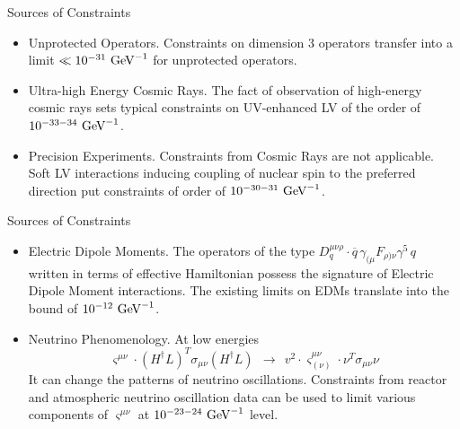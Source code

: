 \documentclass[pdf,UofT06talk,slideColor,colorBG,accumulate]{prosper}
\newcommand{\ov}{\overline}
\newcommand{\GeV}{{\rm GeV}}
\begin{document}
\begin{slide}{Sources of Constraints}

\begin{itemize}

\item {\myit Unprotected Operators}.
	Constraints on dimension 3 operators transfer into a limit
	$ \ll 10^{-31}~\GeV^{-1} $ for unprotected operators.

\item {\myit Ultra-high Energy Cosmic Rays}.
	The fact of observation of high-energy cosmic rays sets typical
	constraints on {\myit UV-enhanced} LV of the order of
	$ 10^{-33-34}~\GeV^{-1} $. 

\item {\myit Precision Experiments}.
	Constraints from Cosmic Rays are not applicable.
	{\myit Soft LV interactions} inducing coupling of nuclear spin to
	the preferred direction put constraints of order of
	$ 10^{-30-31}~\GeV^{-1} $.
	
\end{itemize}

\end{slide}

\begin{slide}{Sources of Constraints}

\begin{itemize}
\item {\myit Electric Dipole Moments}.
	The operators of the type 
$ 	D_q^{\mu\nu\rho} \cdot 
	\ov{q}\, \gamma_{(\mu} F_{\rho)\nu}\gamma^5\, q  $
	written in terms of effective Hamiltonian possess the signature
	of Electric Dipole Moment interactions. 
	The existing limits on EDMs translate into
	the bound of $ 10^{-12}~\GeV^{-1} $.

\item {\myit Neutrino Phenomenology}.
	At low energies
\[
 	\varsigma^{\mu\nu} \cdot
	\left( H^\dag L \right)^T \sigma_{\mu\nu} \left( H^\dag L \right)
	~~\rightarrow~~
	v^2 \cdot \varsigma^{\mu\nu}_{(\nu)} \cdot \nu^T \sigma_{\mu\nu} \nu 
\]
	It can change the patterns of neutrino oscillations.
	Constraints from reactor and atmospheric neutrino oscillation
	data can be used to limit various components of 
	$ \varsigma^{\mu\nu} $ at $ 10^{-23-24}~\GeV^{-1} $ level.

\end{itemize}

\end{slide}
\end{document}
